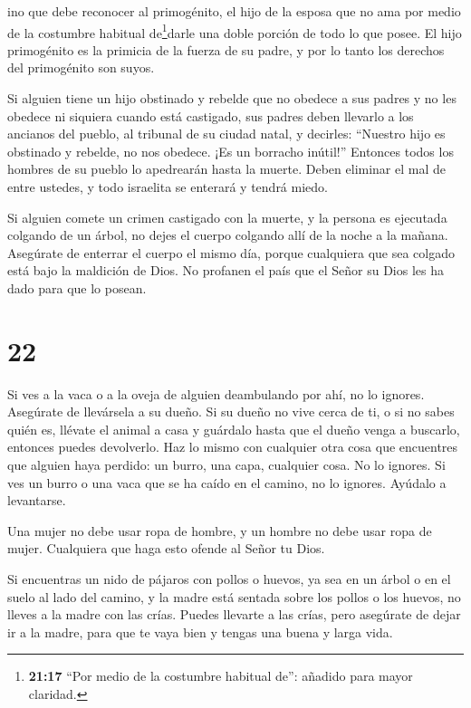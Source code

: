 ino que debe reconocer al primogénito, el hijo de la
esposa que no ama por medio de la costumbre habitual de\footnote{\textbf{21:17}
  ``Por medio de la costumbre habitual de'': añadido para mayor
  claridad.}darle una doble porción de todo lo que posee. El hijo
primogénito es la primicia de la fuerza de su padre, y por lo tanto los
derechos del primogénito son suyos.

 Si alguien tiene un hijo obstinado y rebelde que no
obedece a sus padres y no les obedece ni siquiera cuando está castigado,
 sus padres deben llevarlo a los ancianos del pueblo, al
tribunal de su ciudad natal,  y decirles: ``Nuestro hijo es
obstinado y rebelde, no nos obedece. ¡Es un borracho inútil!''
 Entonces todos los hombres de su pueblo lo apedrearán
hasta la muerte. Deben eliminar el mal de entre ustedes, y todo
israelita se enterará y tendrá miedo.

 Si alguien comete un crimen castigado con la muerte, y la
persona es ejecutada colgando de un árbol,  no dejes el
cuerpo colgando allí de la noche a la mañana. Asegúrate de enterrar el
cuerpo el mismo día, porque cualquiera que sea colgado está bajo la
maldición de Dios. No profanen el país que el Señor su Dios les ha dado
para que lo posean.

\hypertarget{section-21}{%
\section{22}\label{section-21}}

 Si ves a la vaca o a la oveja de alguien deambulando por
ahí, no lo ignores. Asegúrate de llevársela a su dueño.  Si
su dueño no vive cerca de ti, o si no sabes quién es, llévate el animal
a casa y guárdalo hasta que el dueño venga a buscarlo, entonces puedes
devolverlo.  Haz lo mismo con cualquier otra cosa que
encuentres que alguien haya perdido: un burro, una capa, cualquier cosa.
No lo ignores.  Si ves un burro o una vaca que se ha caído
en el camino, no lo ignores. Ayúdalo a levantarse.

 Una mujer no debe usar ropa de hombre, y un hombre no debe
usar ropa de mujer. Cualquiera que haga esto ofende al Señor tu Dios.

 Si encuentras un nido de pájaros con pollos o huevos, ya
sea en un árbol o en el suelo al lado del camino, y la madre está
sentada sobre los pollos o los huevos, no lleves a la madre con las
crías.  Puedes llevarte a las crías, pero asegúrate de dejar
ir a la madre, para que te vaya bien y tengas una buena y larga vida.

